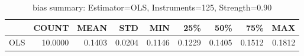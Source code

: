 \begin{table}[ht]
\centering
\caption{bias summary: Estimator=OLS, Instruments=125, Strength=0.90}
\begin{tabular}{lrrrrrrrr}
\toprule
 & COUNT & MEAN & STD & MIN & 25\% & 50\% & 75\% & MAX \\
\midrule
OLS & 10.0000 & 0.1403 & 0.0204 & 0.1146 & 0.1229 & 0.1405 & 0.1512 & 0.1812 \\
\bottomrule
\end{tabular}
\end{table}

